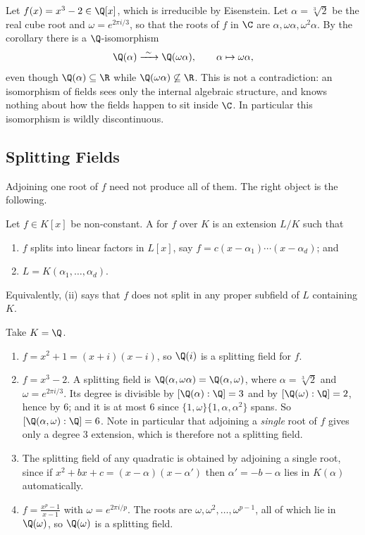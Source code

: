 \begin{example}
	Let $f(x) = x^3 - 2 \in \Q[x]$, which is irreducible by Eisenstein. Let $\alpha = \sqrt[3]2$ be the real cube root and $\omega = e^{2\pi i /3}$, so that the roots of $f$ in $\C$ are $\alpha, \omega\alpha, \omega^2\alpha$. By the corollary there is a $\Q$-isomorphism
	$$\Q(\alpha) \xrightarrow{\ \sim\ } \Q(\omega\alpha), \qquad \alpha \mapsto \omega\alpha,$$
	even though $\Q(\alpha) \subseteq \R$ while $\Q(\omega\alpha) \not\subseteq \R$. This is not a contradiction: an isomorphism of fields sees only the internal algebraic structure, and knows nothing about how the fields happen to sit inside $\C$. In particular this isomorphism is wildly discontinuous.
\end{example}

\subsection{Splitting Fields}

Adjoining one root of $f$ need not produce all of them. The right object is the following.

\begin{definition}
	Let $f \in K[x]$ be non-constant. A  for $f$ over $K$ is an extension $L/K$ such that
	\begin{enumerate}[label=(\roman*)]
		\item $f$ splits into linear factors in $L[x]$, say $f = c(x-\alpha_1)\cdots(x-\alpha_d)$; and
		\item $L = K(\alpha_1, \dots, \alpha_d)$.
	\end{enumerate}
	Equivalently, (ii) says that $f$ does not split in any proper subfield of $L$ containing $K$.
\end{definition}

\begin{example}
	Take $K = \Q$.
	\begin{enumerate}[label=(\roman*)]
		\item $f = x^2 + 1 = (x+i)(x-i)$, so $\Q(i)$ is a splitting field for $f$.
		\item $f = x^3 - 2$. A splitting field is $\Q(\alpha, \omega\alpha) = \Q(\alpha, \omega)$, where $\alpha = \sqrt[3]2$ and $\omega = e^{2\pi i /3}$. Its degree is divisible by $[\Q(\alpha):\Q] = 3$ and by $[\Q(\omega):\Q] = 2$, hence by $6$; and it is at most $6$ since $\{1,\omega\}\{1,\alpha,\alpha^2\}$ spans. So $[\Q(\alpha,\omega):\Q] = 6$. Note in particular that adjoining a \emph{single} root of $f$ gives only a degree $3$ extension, which is therefore not a splitting field.
		\item The splitting field of any quadratic is obtained by adjoining a single root, since if $x^2+bx+c = (x-\alpha)(x-\alpha')$ then $\alpha' = -b-\alpha$ lies in $K(\alpha)$ automatically.
		\item $f = \frac{x^p-1}{x-1}$ with $\omega = e^{2\pi i /p}$. The roots are $\omega, \omega^2, \dots, \omega^{p-1}$, all of which lie in $\Q(\omega)$, so $\Q(\omega)$ is a splitting field.
	\end{enumerate}
\end{example}

